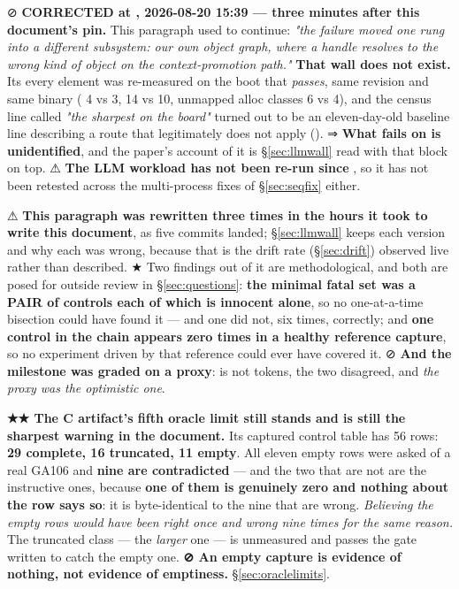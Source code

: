 \documentclass[10.5pt]{article}
\begin{document}
\begin{claimbox}
\smallskip
⊘ \textbf{CORRECTED at , 2026-08-20 15:39 --- three minutes after this document's
pin.} This paragraph used to continue: \emph{"the failure moved one rung into a different
subsystem: our own object graph, where a handle resolves to the wrong kind of object on the
context-promotion path."} \textbf{That wall does not exist.} Its every element was re-measured on
the boot that \emph{passes}, same revision and same binary
( 4 vs 3,  14 vs 10,
unmapped alloc classes 6 vs 4), and the census line called \emph{"the sharpest on the board"}
turned out to be an eleven-day-old baseline line describing a route that legitimately does not
apply (). ⇒ \textbf{What  fails on is
unidentified}, and the paper's account of it is \S\ref{sec:llmwall} read with that block on top.
⚠ \textbf{The LLM workload has not been re-run since }, so it has not been retested
across the multi-process fixes of \S\ref{sec:seqfix} either.

\smallskip
⚠ \textbf{This paragraph was rewritten three times in the hours it took to write this document},
as five commits landed; \S\ref{sec:llmwall} keeps each version and why each was wrong, because
that is the drift rate (\S\ref{sec:drift}) observed live rather than described. ★ Two findings out
of it are methodological, and both are posed for outside review in \S\ref{sec:questions}:
\textbf{the minimal fatal set was a PAIR of controls each of which is innocent alone}, so no
one-at-a-time bisection could have found it — and one did not, six times, correctly; and
\textbf{one control in the chain appears zero times in a healthy reference capture}, so no
experiment driven by that reference could ever have covered it. ⊘ \textbf{And the milestone was
graded on a proxy}:  is not tokens, the two disagreed, and \emph{the proxy
was the optimistic one}.

\smallskip
\textbf{★★ The C artifact's fifth oracle limit still stands and is still the sharpest warning in
the document.} Its captured control table has 56 rows: \textbf{29 complete, 16 truncated, 11
empty}. All eleven empty rows were asked of a real GA106 and \textbf{nine are contradicted} — and
the two that are not are the instructive ones, because \textbf{one of them is genuinely zero and
nothing about the row says so}: it is byte-identical to the nine that are wrong. \emph{Believing
the empty rows would have been right once and wrong nine times for the same reason.} The truncated
class — the \emph{larger} one — is unmeasured and passes the gate written to catch the empty one.
\textbf{⊘ An empty capture is evidence of nothing, not evidence of emptiness.} \S\ref{sec:oraclelimits}.


\end{claimbox}
\end{document}
